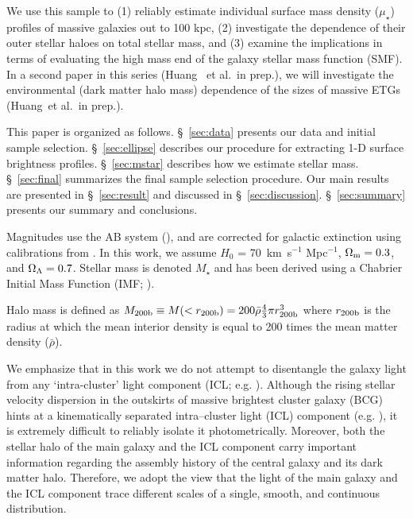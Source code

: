 \documentclass[fleqn,usenatbib]{mnras}
\def\etal{{\ et al.~}}
\def\mstar{{$M_{\star}$}}
\def\mden{{$\mu_{\star}$}}
\begin{document}
    We use this sample to 
    (1) reliably estimate individual surface mass density (\mden{}) profiles of 
    massive galaxies out to 100 kpc, 
    (2) investigate the dependence of their outer stellar haloes on total stellar 
    mass, and 
    (3) examine the implications in terms of evaluating the high mass end of the 
    galaxy stellar mass function (SMF). 
    In a second paper in this series (Huang \etal in prep.), we will investigate 
    the environmental (dark matter halo mass) dependence of the sizes of massive 
    ETGs (Huang\etal in prep.).
    
    This paper is organized as follows. 
    \S~\ref{sec:data} presents our data and initial sample selection. 
    \S~\ref{sec:ellipse} describes our procedure for extracting 1-D surface 
    brightness profiles. 
    \S~\ref{sec:mstar} describes how we estimate stellar mass.
    \S~\ref{sec:final} summarizes the final sample selection procedure. 
    Our main results are presented in \S~\ref{sec:result} and discussed in 
    \S~\ref{sec:discussion}. 
    \S~\ref{sec:summary} presents our summary and conclusions.

    Magnitudes use the AB system (\citealt{Oke1983}), and are corrected for galactic 
    extinction using calibrations from \citet{Schlafly11}.
    In this work, we assume $H_0$ = 70~km~s$^{-1}$ Mpc$^{-1}$, ${\Omega}_{\rm m}=0.3$, 
    and ${\Omega}_{\rm \Lambda}=0.7$.
    Stellar mass is denoted \mstar{} and has been derived using a Chabrier Initial Mass 
    Function (IMF; \citealt{Chabrier2003}).   
      
    Halo mass is defined as 
    $M_{\rm 200b}\equiv M(<r_{\rm 200b})=200\bar{\rho} 
    \frac{4}{3}\pi r_{\rm 200b}^3$ where $r_{\rm 200b}$
    is the radius at which the mean interior density is equal to 200 times
    the mean matter density ($\bar{\rho}$). 
    
    We emphasize that in this work we do not attempt to disentangle the 
    galaxy light from any `intra-cluster' light component (ICL; e.g. 
    \citealt{Carlberg1997, Lin2004, Gonzalez2005, Mihos2005}). 
    Although the rising stellar velocity dispersion in the outskirts of massive 
    brightest cluster galaxy (BCG)
    hints at a kinematically separated intra--cluster light (ICL) component (e.g. 
    \citealt{Dressler1979, Carter1999, Kelson2002, Bender2015, Longobardi2015}),
    it is extremely difficult to reliably isolate it photometrically.
    Moreover, both the stellar halo of the main galaxy and the ICL component carry 
    important information regarding the assembly history of the central galaxy and its 
    dark matter halo. 
    Therefore, we adopt the view that the light of the main galaxy and the 
    ICL component trace different scales of a single, smooth, and continuous 
    distribution.
        
\end{document}
